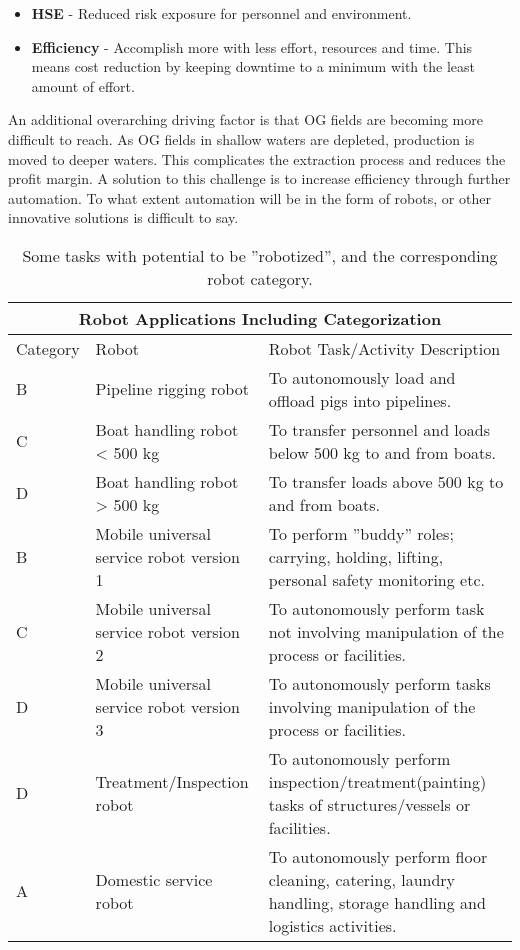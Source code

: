 \begin{itemize}
	\item \textbf{HSE} - Reduced risk exposure for personnel and environment. 
	\item \textbf{Efficiency} - Accomplish more with less effort, resources and time. This means cost reduction by keeping downtime to a minimum with the least amount of effort.
\end{itemize} 

An additional overarching driving factor is that \ac{OG} fields are becoming more difficult to reach. As \ac{OG} fields in shallow waters are depleted, production is moved to deeper waters. This complicates the extraction process and reduces the profit margin. A solution to this challenge is to increase efficiency through further automation. To what extent automation will be in the form of robots, or other innovative solutions is difficult to say. 

\begin{table}
\centering
\begin{tabular}{ |p{2cm} p{3cm} p{5cm}| }
\hline
\multicolumn{3}{|c|}{Robot Applications Including Categorization}\\
\hline\hline
Category & Robot & Robot Task/Activity Description \\ 
\hline
B & Pipeline rigging robot & To autonomously load and offload pigs into pipelines. \\
C & Boat handling robot < 500 kg & To transfer personnel and loads below 500 kg to and from boats.\\
D & Boat handling robot > 500 kg & To transfer loads above 500 kg to and from boats.\\
\hline
B & Mobile universal service robot version 1 & To perform ''buddy'' roles; carrying, holding, lifting, personal safety monitoring etc. \\
C & Mobile universal service robot version 2 & To autonomously perform task not involving manipulation of the process or facilities.\\
D & Mobile universal service robot version 3 & To autonomously perform tasks involving manipulation of the process or facilities. \\
D & Treatment/Inspection robot & To autonomously perform inspection/treatment(painting) tasks of structures/vessels or facilities.\\
\hline
A & Domestic service robot & To autonomously perform floor cleaning, catering, laundry handling, storage handling and logistics activities. \\
\hline\hline 
\end{tabular}
\caption{Some tasks with potential to be ''robotized'', and the corresponding robot category\cite{6094661}.} 
\label{tab:tasks_capabilities}
\end{table}

